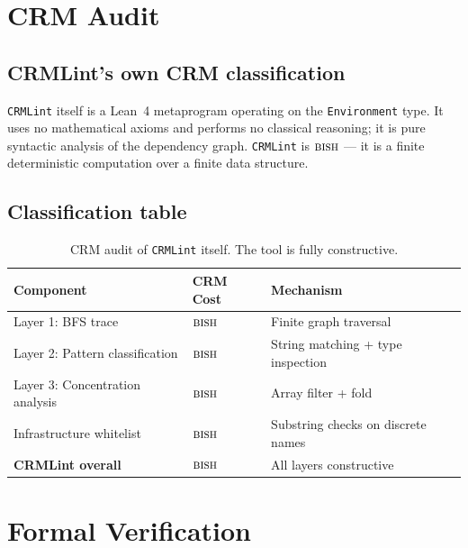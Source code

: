 \documentclass[12pt, a4paper]{article}
\theoremstyle{plain}
\theoremstyle{definition}
\theoremstyle{remark}
\newcommand{\BISH}{\textsc{bish}}
\newcommand{\CRMLint}{\texttt{CRMLint}}
\begin{document}
\section{CRM Audit}\label{sec:audit}

\subsection{CRMLint's own CRM classification}

\CRMLint{} itself is a Lean~4 metaprogram operating on the
\texttt{Environment} type.  It uses no mathematical axioms and
performs no classical reasoning; it is pure syntactic analysis
of the dependency graph.  \CRMLint{} is $\BISH$ --- it is a
finite deterministic computation over a finite data structure.

\subsection{Classification table}

\begin{table}[h]
\centering
\begin{tabular}{lll}
\toprule
Component & CRM Cost & Mechanism \\
\midrule
Layer 1: BFS trace & $\BISH$ & Finite graph traversal \\
Layer 2: Pattern classification & $\BISH$ & String matching + type inspection \\
Layer 3: Concentration analysis & $\BISH$ & Array filter + fold \\
Infrastructure whitelist & $\BISH$ & Substring checks on discrete names \\
\midrule
\textbf{CRMLint overall} & $\BISH$ & All layers constructive \\
\bottomrule
\end{tabular}
\caption{CRM audit of \CRMLint{} itself.  The tool is fully constructive.}
\label{tab:self-audit}
\end{table}


\section{Formal Verification}\label{sec:lean}
\end{document}
